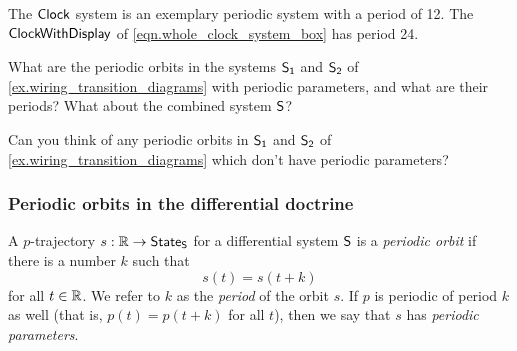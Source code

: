 \documentclass[DynamicalBook]{subfiles}
\begin{document}
\begin{example}
  The $\mathsf{Clock}$ system is an exemplary periodic system with a period of 12.
  The $\mathsf{ClockWithDisplay}$ of \cref{eqn.whole_clock_system_box} has period 24.
\end{example}

\begin{exercise}\label{ex.wiring_transition_diagrams_periodic_orbits}
  What are the periodic orbits in the systems $\mathsf{S_1}$ and $\mathsf{S_2}$ of
  \cref{ex.wiring_transition_diagrams} with periodic parameters, and what are their periods? What about
  the combined system $\mathsf{S}$?
\end{exercise}

\begin{exercise}\label{ex.wiring_transition_diagrams_periodic_parameters}
  Can you think of any periodic orbits in $\mathsf{S_1}$ and $\mathsf{S_2}$ of
  \cref{ex.wiring_transition_diagrams} which
  don't have periodic parameters? 
\end{exercise}

\subsubsection{Periodic orbits in the differential doctrine}

\begin{definition}
A $p$-trajectory $s : \mathbb{R} \to \mathsf{State}_{\mathsf{S}}$ for a differential system $\mathsf{S}$ is
a \emph{periodic orbit} if there is a number $k$ such that
\[
s(t) = s(t + k)
\]
for all $t \in \mathbb{R}$. We refer to $k$ as the \emph{period} of the orbit $s$. If
$p$ is periodic of period $k$ as well (that is, $p(t) = p(t + k)$ for all $t$),
then we say that $s$ has \emph{periodic parameters}.
\end{definition}
\end{document}
